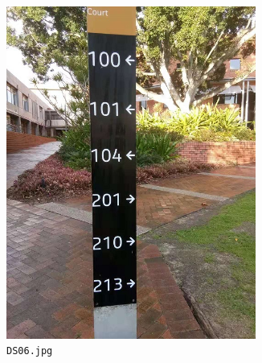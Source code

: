\documentclass{article}
\begin{document}
\begin{figure}[h]
  \centering
  \begin{subfigure}[h]{0.22\textwidth}
    \centering
    \includegraphics[width=0.9\textwidth]{../train/task2/DS06}
    \caption[DS06]{
      \lstinline{DS06.jpg}
    }
    \label{fig:ds06}
  \end{subfigure}
  \begin{subfigure}[h]{0.22\textwidth}
    \centering

\end{subfigure}
\end{figure}
\end{document}
